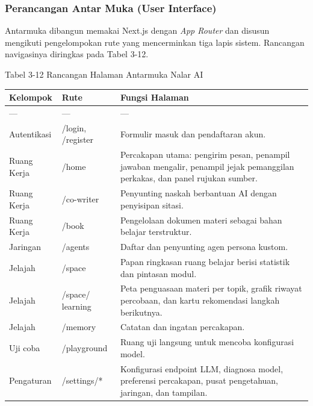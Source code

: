 \documentclass[12pt,a4paper]{article}
\begin{document}
\subsubsection*{Perancangan Antar Muka (User Interface)}

Antarmuka dibangun memakai Next.js dengan \textit{App Router} dan disusun mengikuti pengelompokan rute yang mencerminkan tiga lapis sistem. Rancangan navigasinya diringkas pada Tabel 3-12.



Tabel 3-12	Rancangan Halaman Antarmuka Nalar AI



\begin{table}[h]

\centering

\begin{tabular}{lll}

\toprule

Kelompok & Rute & Fungsi Halaman \\

\midrule

--- & --- & --- \\

Autentikasi & /login, /register & Formulir masuk dan pendaftaran akun. \\

Ruang Kerja & /home & Percakapan utama: pengirim pesan, penampil jawaban mengalir, penampil jejak pemanggilan perkakas, dan panel rujukan sumber. \\

Ruang Kerja & /co-writer & Penyunting naskah berbantuan AI dengan penyisipan sitasi. \\

Ruang Kerja & /book & Pengelolaan dokumen materi sebagai bahan belajar terstruktur. \\

Jaringan & /agents & Daftar dan penyunting agen persona kustom. \\

Jelajah & /space & Papan ringkasan ruang belajar berisi statistik dan pintasan modul. \\

Jelajah & /space/ learning & Peta penguasaan materi per topik, grafik riwayat percobaan, dan kartu rekomendasi langkah berikutnya. \\

Jelajah & /memory & Catatan dan ingatan percakapan. \\

Uji coba & /playground & Ruang uji langsung untuk mencoba konfigurasi model. \\

Pengaturan & /settings/* & Konfigurasi endpoint LLM, diagnosa model, preferensi percakapan, pusat pengetahuan, jaringan, dan tampilan. \\

\bottomrule

\end{tabular}

\end{table}
\end{document}
